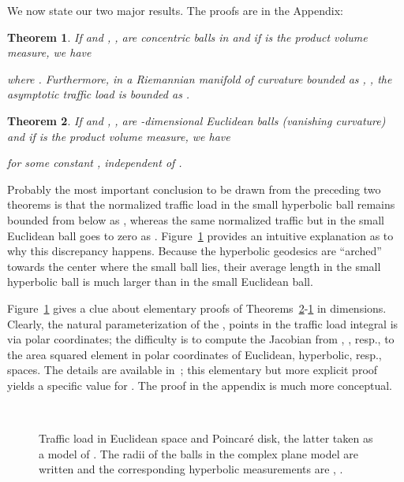 \documentclass{article}
\newtheorem{theorem}{Theorem}
\begin{document}
We now state our two major results. The proofs are in the Appendix: 
\begin{theorem}
\label{t:hyperbolic_traffic}
If  and , , are concentric balls in  
and if  is the product volume measure, 
we have 
 
where . Furthermore, 
in a Riemannian manifold of curvature bounded as , , 
the asymptotic traffic load is bounded as . 
\end{theorem}



\begin{theorem}
\label{t:euclidean_traffic}
If  and , , are -dimensional Euclidean balls (vanishing curvature) 
and if  is the product volume measure, 
we have 
 
for some constant , independent of . 
\end{theorem}

Probably the most important conclusion to be drawn from the preceding two theorems is that 
the normalized traffic load in the small hyperbolic ball  remains bounded from below as ,  
whereas the same normalized traffic but in the small Euclidean ball goes to zero as . 
Figure~\ref{f:euclidean_poincare} provides an intuitive explanation as to why this discrepancy happens. 
Because the hyperbolic geodesics are ``arched'' towards the center where the small ball lies, 
their average length in the small hyperbolic ball is much larger than in the small Euclidean ball. 

Figure~\ref{f:euclidean_poincare} gives a clue about elementary proofs of Theorems~\ref{t:euclidean_traffic}-\ref{t:hyperbolic_traffic} in  dimensions.
Clearly, the natural parameterization of the ,  points in the traffic load integral is via polar coordinates; 
the difficulty is to compute the Jacobian from , , resp.,  
to the area squared element in polar coordinates of Euclidean, hyperbolic, resp., spaces.  
The details are available in~\cite{mingjithesis}; this elementary but more explicit proof yields 
a specific value for . The proof in the appendix is much more conceptual. 


\begin{figure}[t]
\hskip-2cm\mbox{
}
\caption{Traffic load in Euclidean space and Poincar\'e disk, 
the latter taken as a model of . The radii of the balls 
in the complex plane model are written  and the corresponding hyperbolic measurements are 
, .}
\label{f:euclidean_poincare}
\end{figure}
\end{document}
